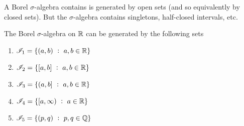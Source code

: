 A Borel $\sigma$-algebra contains is generated by open sets (and so equivalently by closed sets). But
the $\sigma$-algebra contains singletons, half-closed intervals, etc.

\begin{theorem}
  The Borel $\sigma$-algebra on $\mathbb{R}$ can be generated by the following sets
  \begin{enumerate}
  \item $\mathscr I_1 = \{(a, b) ~:~ a, b \in \mathbb{R}\}$
  \item $\mathscr I_2 = \{[a, b] ~:~ a, b \in \mathbb{R}\}$
  \item $\mathscr I_3 = \{(a, b] ~:~ a, b \in \mathbb{R}\}$
  \item $\mathscr I_4 = \{[a, \infty) ~:~ a \in \mathbb{R}\}$
  \item $\mathscr I_5 = \{(p, q) ~:~ p, q \in \mathbb{Q}\}$
  \end{enumerate}
\end{theorem}

